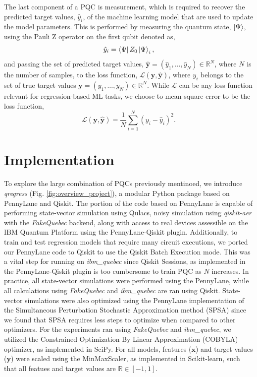 \documentclass[journal=jacsat,manuscript=article]{achemso}
\begin{document}
The last component of a PQC is measurement, which is required to recover the predicted target values, $\hat{y}_{i}$, of the machine learning model that are used to update the model parameters.
This is performed by measuring the quantum state, $\ket{\Psi}$, using the Pauli Z operator on the first qubit denoted as,
\begin{equation}
	\hat{y}_{i} = \bra{\Psi}Z_{0}\ket{\Psi}_{i},
	\label{eq:y_pred}
\end{equation}
and passing the set of predicted target values, $\bm{\hat{y}} = (\hat{y}_{1}, \ldots, \hat{y}_{N}) \in \mathbb{R}^{N}$, where $N$ is the number of samples, to the loss function, $\mathcal{L}(\bm{y}, \bm{\hat y})$, where $y_{i}$ belongs to the set of true target values $\bm{y} = (y_{1}, \ldots, y_{N}) \in \mathbb{R}^{N}$.
While $\mathcal{L}$ can be any loss function relevant for regression-based ML tasks, we choose to mean square error to be the loss function,
\begin{equation}
	\mathcal{L}(\bm{y}, \bm{\hat y}) = \frac{1}{N} \sum_{i=1}^{N} (y_{i} - \hat{y}_{i})^{2}.
	\label{eq:isthisloss}
\end{equation}


\section{Implementation}
To explore the large combination of PQCs previously mentinoed, we introduce \textit{qregress} (Fig. \ref{fig:overview_project}), a modular Python package based on PennyLane\cite{bergholm_pennylane_2022} and Qiskit\cite{javadi-abhari_quantum_2024}.
The portion of the code based on PennyLane is capable of performing state-vector simulation using Qulacs\cite{suzuki_qulacs_2021}, noisy simulation using \textit{qiskit-aer} with the \textit{FakeQuebec} backend, along with access to real devices assessible on the IBM Quantum Platform using the PennyLane-Qiskit plugin.
Additionally, to train and test regression models that require many circuit executions, we ported our PennyLane code to Qiskit to use the Qiskit Batch Execution mode.
This was a vital step for running on \textit{ibm\_quebec} since Qiskit Sessions, as implemented in the PennyLane-Qiskit plugin is too cumbersome to train PQC as $N$ increases.
In practice, all state-vector simulations were performed using the PennyLane, while all calculations using \textit{FakeQuebec} and \textit{ibm\_quebec}  are ran using Qiskit.
State-vector simulations were also optimized using the PennyLane implementation of the Simultaneous Perturbation Stochastic Approximation method (SPSA) since we found that SPSA requires less steps to optimize when compared to other optimizers. 
For the experiments ran using \textit{FakeQuebec} and  \textit{ibm\_quebec}, we utilized the Constrained Optimization By Linear Approximation (COBYLA) optimizer, as implemented in SciPy\cite{virtanen_scipy_2020}.
For all models, features ($\mathbf{x}$) and target values ($\mathbf{y}$) were scaled using the MinMaxScaler, as implemented in Scikit-learn\cite{pedregosa_scikit-learn_2011}, such that all featues and target values are $\mathbb{R}\in [ -1,1 ]$.
\end{document}
